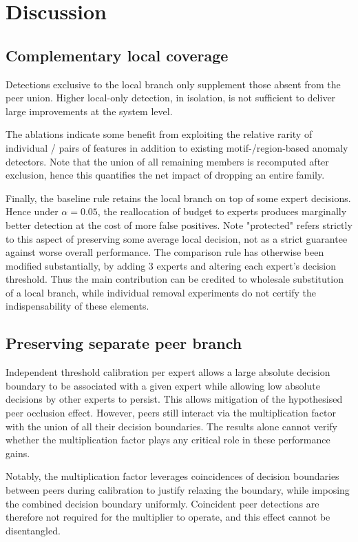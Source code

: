 \section{Discussion} 
\label{sec:discussion} 
\subsection{Complementary local coverage} 
Detections exclusive to the local branch only supplement those absent from the peer union. Higher local-only detection, in isolation, is not sufficient to deliver large improvements at the system level.

The ablations indicate some benefit from exploiting the relative rarity of individual / pairs of features in addition to existing motif-/region-based anomaly detectors. Note that the union of all remaining members is recomputed after exclusion, hence this quantifies the net impact of dropping an entire family.

Finally, the baseline rule retains the local branch on top of some expert decisions. Hence under $\alpha=0.05$, the reallocation of budget to experts produces marginally better detection at the cost of more false positives. Note "protected" refers strictly to this aspect of preserving some average local decision, not as a strict guarantee against worse overall performance. The comparison rule has otherwise been modified substantially, by adding 3 experts and altering each expert's decision threshold. Thus the main contribution can be credited to wholesale substitution of a local branch, while individual removal experiments do not certify the indispensability of these elements.

\subsection{Preserving separate peer branch} 
Independent threshold calibration per expert allows a large absolute decision boundary to be associated with a given expert while allowing low absolute decisions by other experts to persist. This allows mitigation of the hypothesised peer occlusion effect. However, peers still interact via the multiplication factor with the union of all their decision boundaries. The results alone cannot verify whether the multiplication factor plays any critical role in these performance gains.

Notably, the multiplication factor leverages coincidences of decision boundaries between peers during calibration to justify relaxing the boundary, while imposing the combined decision boundary uniformly. Coincident peer detections are therefore not required for the multiplier to operate, and this effect cannot be disentangled.

